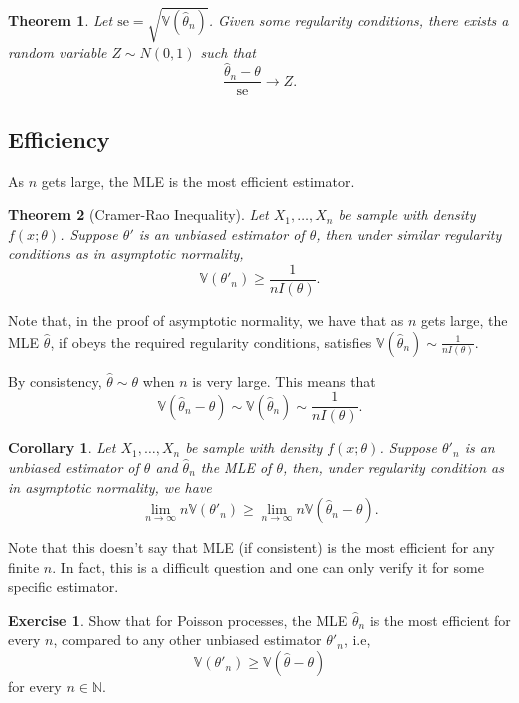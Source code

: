 \documentclass[
  openany]{book}
\newtheorem{theorem}{Theorem}[chapter]
\newtheorem{corollary}{Corollary}[chapter]
\theoremstyle{definition}
\theoremstyle{definition}
\theoremstyle{definition}
\newtheorem{exercise}{Exercise}[chapter]
\theoremstyle{definition}
\theoremstyle{remark}
\begin{document}
\begin{theorem}
Let \(\mathrm{se} = \sqrt{\mathbb{V}(\hat \theta_n)}\).
Given some regularity conditions,
there exists a random variable \(Z \sim N(0,1)\) such that
\[\frac{\hat\theta_n - \theta}{\mathrm{se}} \to Z.\]
\end{theorem}

\hypertarget{efficiency}{%
\subsection{Efficiency}\label{efficiency}}

As \(n\) gets large, the MLE is the most efficient estimator.

\begin{theorem}[Cramer-Rao Inequality]
Let \(X_1, \dots, X_n\) be sample with density \(f(x;\theta)\).
Suppose \(\theta'\) is an unbiased estimator of \(\theta\), then
under similar regularity conditions as in asymptotic normality,
\[ \mathbb{V}(\theta'_n) \geq \frac{1}{n I(\theta)}.\]
\end{theorem}

Note that, in the proof of asymptotic normality, we have that
as \(n\) gets large, the MLE \(\hat \theta\), if obeys the required regularity conditions, satisfies
\(\mathbb{V}( \hat \theta_n )\sim \frac{1}{n I(\theta)}\).

By consistency, \(\hat \theta \sim \theta\) when \(n\) is very large.
This means that
\[\mathbb{V}( \hat \theta_n - \theta ) \sim\mathbb{V}( \hat \theta_n )\sim \frac{1}{n I(\theta)}.\]

\begin{corollary}
Let \(X_1, \dots, X_n\) be sample with density \(f(x;\theta)\).
Suppose \(\theta'_n\) is an unbiased estimator of \(\theta\) and \(\hat \theta_n\) the MLE of \(\theta\), then, under regularity condition as in asymptotic normality, we have
\[ \lim_{n\to \infty} n \mathbb{V}(\theta'_n) \geq \lim_{n\to \infty} n\mathbb{V}(\hat \theta_n - \theta) .\]
\end{corollary}

Note that this doesn't say that MLE (if consistent) is the most efficient for any finite \(n\).
In fact, this is a difficult question and one can only verify it for some
specific estimator.

\begin{exercise}
Show that for Poisson processes, the MLE \(\hat \theta_n\) is the most efficient for every \(n\), compared to any other unbiased
estimator \(\theta'_n\), i.e,
\[\mathbb{V}(\theta'_n) \geq \mathbb{V}(\hat\theta - \theta)\] for every \(n\in \mathbb{N}\).
\end{exercise}
\end{document}
